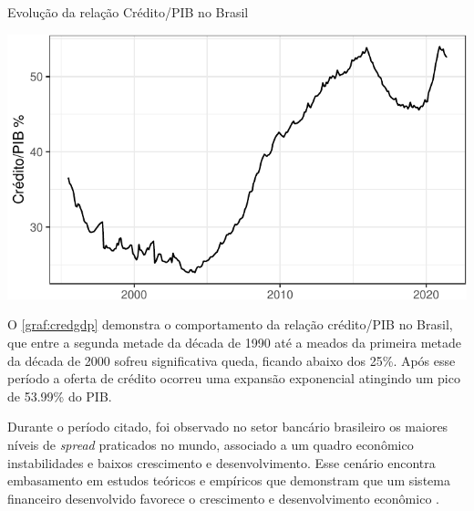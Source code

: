\documentclass[
  12pt,
  12pt,
  openright,
  oneside,
  a4paper,
  chapter=TITLE,
  section=TITLE,
  subsection=TITLE,
  subsubsection=TITLE,
  english,
  portugues,
  sumario=tradicional]{abntex2}
\begin{document}
\begin{grafico}[!tb]
\vspace{20pt}
\caption{Evolução da relação Crédito/PIB no Brasil}
\vspace{-4mm}

\begin{center}\includegraphics{12-exportedfigures/credit.gdp-1} \end{center}
\vspace{-3mm}
\label{graf:credgdp}
\vspace{-2mm}
\end{grafico}

O \autoref{graf:credgdp} demonstra o comportamento da relação crédito/PIB no Brasil, que entre a segunda metade da década de 1990 até a meados da primeira metade da década de 2000 sofreu significativa queda, ficando abaixo dos 25\%. Após esse período a oferta de crédito ocorreu uma expansão exponencial atingindo um pico de 53.99\% do PIB.

Durante o período citado, foi observado no setor bancário brasileiro os maiores níveis de \emph{spread} praticados no mundo, associado a um quadro econômico instabilidades e baixos crescimento e desenvolvimento. Esse cenário encontra embasamento em estudos teóricos e empíricos que demonstram que um sistema financeiro desenvolvido favorece o crescimento e desenvolvimento econômico \cite{levine:1997, matos:2003}.
\end{document}
